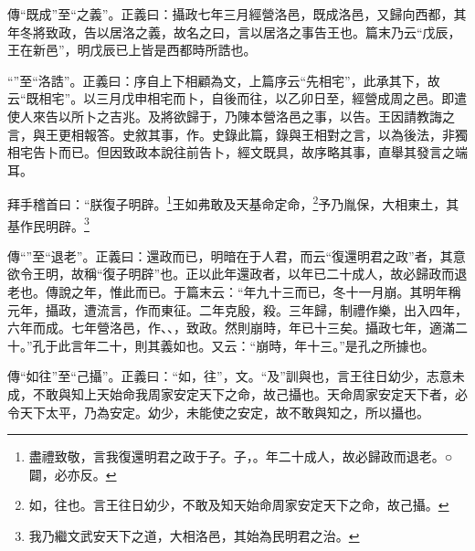 {\noindent\zhuan{}\fzbyks 傳“既成”至“之義”。正義曰：攝政七年三月經營洛邑，既成洛邑，又歸向西都，其年冬將致政，告以居洛之義，故名之曰，言以居洛之事告王也。篇末乃云“戊辰，王在新邑”，明戊辰已上皆是西都時所誥也。 \par}

{\noindent\shu{}\fzkt “”至“洛誥”。正義曰：序自上下相顧為文，上篇序云“先相宅”，此承其下，故云“既相宅”。以三月戊申相宅而卜，自後而往，以乙卯日至，經營成周之邑。即遣使人來告以所卜之吉兆。及將欲歸于，乃陳本營洛邑之事，以告。王因請教誨之言，與王更相報答。史敘其事，作。史錄此篇，錄與王相對之言，以為後法，非獨相宅告卜而已。但因致政本說往前告卜，經文既具，故序略其事，直舉其發言之端耳。 \par}

拜手稽首曰：“朕復子明辟。\footnote{盡禮致敬，言我復還明君之政于子。子，。年二十成人，故必歸政而退老。○闢，必亦反。}王如弗敢及天基命定命，\footnote{如，往也。言王往日幼少，不敢及知天始命周家安定天下之命，故己攝。}予乃胤保，大相東土，其基作民明辟。\footnote{我乃繼文武安天下之道，大相洛邑，其始為民明君之治。}


{\noindent\zhuan{}\fzbyks 傳“”至“退老”。正義曰：還政而已，明暗在于人君，而云“復還明君之政”者，其意欲令王明，故稱“復子明辟”也。正以此年還政者，以年已二十成人，故必歸政而退老也。傳說之年，惟此而已。于篇末云：“年九十三而已，冬十一月崩。其明年稱元年，攝政，遭流言，作而東征。二年克殷，殺。三年歸，制禮作樂，出入四年，六年而成。七年營洛邑，作、、，致政。然則崩時，年已十三矣。攝政七年，適滿二十。”孔于此言年二十，則其義如也。又云：“崩時，年十三。”是孔之所據也。 \par}

{\noindent\zhuan{}\fzbyks 傳“如往”至“己攝”。正義曰：“如，往”，文。“及”訓與也，言王往日幼少，志意未成，不敢與知上天始命我周家安定天下之命，故己攝也。天命周家安定天下者，必令天下太平，乃為安定。幼少，未能使之安定，故不敢與知之，所以攝也。 \par}

